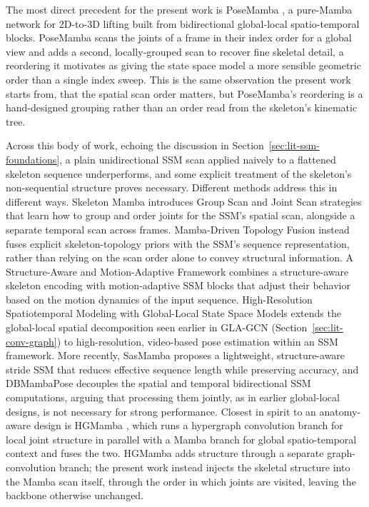 The most direct precedent for the present work is PoseMamba
\cite{huang2025posemamba}, a pure-Mamba network for 2D-to-3D lifting built
from bidirectional global-local spatio-temporal blocks. PoseMamba scans the
joints of a frame in their index order for a global view and adds a second,
locally-grouped scan to recover fine skeletal detail, a reordering it
motivates as giving the state space model a more sensible geometric order
than a single index sweep. This is the same observation the present work
starts from, that the spatial scan order matters, but PoseMamba's reordering
is a hand-designed grouping rather than an order read from the skeleton's
kinematic tree.

Across this body of work, echoing the discussion in
Section~\ref{sec:lit-ssm-foundations}, a plain unidirectional SSM scan
applied naively to a flattened skeleton sequence underperforms, and some
explicit treatment of the skeleton's non-sequential structure proves
necessary. Different methods address this in different ways. Skeleton
Mamba \cite{nguyen2025skeletonmamba} introduces Group Scan and Joint Scan
strategies that learn how to group and order joints for the SSM's spatial
scan, alongside a separate temporal scan across frames. Mamba-Driven
Topology Fusion \cite{zheng2025mambatopology} instead fuses explicit
skeleton-topology priors with the SSM's sequence representation, rather
than relying on the scan order alone to convey structural information. A
Structure-Aware and Motion-Adaptive Framework \cite{lu2025structureawaremamba}
combines a structure-aware skeleton encoding with motion-adaptive SSM
blocks that adjust their behavior based on the motion dynamics of the
input sequence. High-Resolution Spatiotemporal Modeling with Global-Local
State Space Models \cite{feng2025highresssm} extends the global-local
spatial decomposition seen earlier in GLA-GCN
(Section~\ref{sec:lit-conv-graph}) to high-resolution, video-based pose
estimation within an SSM framework. More recently, SasMamba
\cite{cui2025sasmamba} proposes a lightweight, structure-aware stride SSM
that reduces effective sequence length while preserving accuracy, and
DBMambaPose \cite{wang2025dbmambapose} decouples the spatial and temporal
bidirectional SSM computations, arguing that processing them jointly, as
in earlier global-local designs, is not necessary for strong performance.
Closest in spirit to an anatomy-aware design is HGMamba
\cite{cui2025hgmamba}, which runs a hypergraph convolution branch for local
joint structure in parallel with a Mamba branch for global spatio-temporal
context and fuses the two. HGMamba adds structure through a separate
graph-convolution branch; the present work instead injects the skeletal
structure into the Mamba scan itself, through the order in which joints are
visited, leaving the backbone otherwise unchanged.

